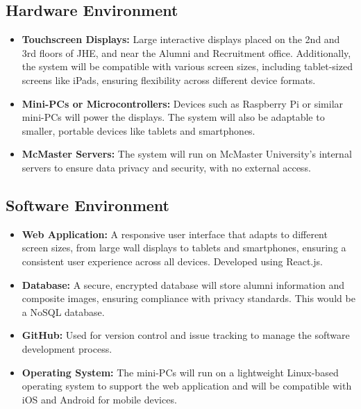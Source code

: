 \documentclass{article}
\begin{document}
\subsection*{Hardware Environment}
\begin{itemize}
    \item \textbf{Touchscreen Displays:}  
    Large interactive displays placed on the 2nd and 3rd floors of JHE, and near the Alumni and Recruitment office. Additionally, the system will be compatible with various screen sizes, including tablet-sized screens like iPads, ensuring flexibility across different device formats.

    \item \textbf{Mini-PCs or Microcontrollers:}  
    Devices such as Raspberry Pi or similar mini-PCs will power the displays. The system will also be adaptable to smaller, portable devices like tablets and smartphones.

    \item \textbf{McMaster Servers:}  
    The system will run on McMaster University’s internal servers to ensure data privacy and security, with no external access.
\end{itemize}

\subsection*{Software Environment}
\begin{itemize}
    \item \textbf{Web Application:}  
    A responsive user interface that adapts to different screen sizes, from large wall displays to tablets and smartphones, ensuring a consistent user experience across all devices. Developed using React.js.

    \item \textbf{Database:}  
    A secure, encrypted database will store alumni information and composite images, ensuring compliance with privacy standards. This would be a NoSQL database.

    \item \textbf{GitHub:}  
    Used for version control and issue tracking to manage the software development process.

    \item \textbf{Operating System:}  
    The mini-PCs will run on a lightweight Linux-based operating system to support the web application and will be compatible with iOS and Android for mobile devices.
\end{itemize}
\end{document}
